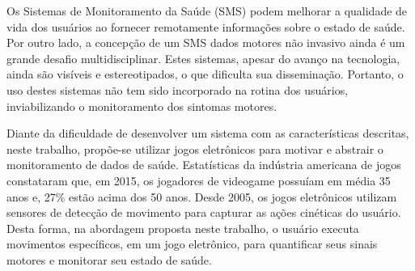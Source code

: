 


Os Sistemas de Monitoramento da Saúde (SMS) podem melhorar a qualidade de vida dos usuários ao fornecer remotamente informações sobre o estado de saúde. Por outro lado, a concepção de um SMS dados motores não invasivo ainda é um grande desafio multidisciplinar. Estes sistemas, apesar do avanço na tecnologia, ainda são visíveis e estereotipados, o que dificulta sua disseminação. Portanto, o uso destes sistemas não tem sido incorporado na rotina dos usuários, inviabilizando o monitoramento dos sintomas motores.
 
Diante da dificuldade de desenvolver um sistema com as características descritas, neste trabalho, propõe-se utilizar jogos eletrônicos para motivar e abstrair o monitoramento de dados de saúde. Estatísticas da indústria americana de jogos constataram que, em 2015, os jogadores de videogame possuíam em média 35 anos e, 27$\%$  estão acima dos 50 anos. Desde 2005, os jogos eletrônicos utilizam sensores de detecção de movimento para capturar as ações cinéticas do usuário. Desta forma, na abordagem proposta neste trabalho, o usuário executa movimentos específicos, em um jogo eletrônico, para quantificar seus sinais motores e monitorar seu estado de saúde.

